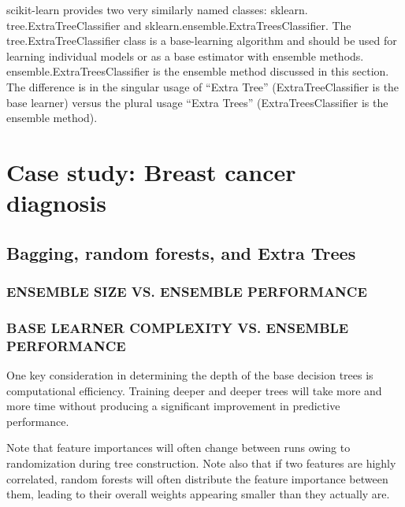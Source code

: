 \begin{tcolorbox}[title=CAUTION]
    scikit-learn provides two very similarly named classes: sklearn.
    tree.ExtraTreeClassifier
    and
    sklearn.ensemble.ExtraTreesClassifier. The tree.ExtraTreeClassifier class is a base-learning algorithm and should be used for learning individual models or as a base estimator
    with ensemble methods. ensemble.ExtraTreesClassifier is the ensemble method discussed in this section. The difference is in the singular usage of
    “Extra Tree” (ExtraTreeClassifier is the base learner) versus the plural
    usage “Extra Trees” (ExtraTreesClassifier is the ensemble method).
\end{tcolorbox}

\section{Case study: Breast cancer diagnosis}
\subsection{Bagging, random forests, and Extra Trees}
\subsubsection*{ENSEMBLE SIZE VS. ENSEMBLE PERFORMANCE}
\subsubsection*{BASE LEARNER COMPLEXITY VS. ENSEMBLE PERFORMANCE}
One key consideration in determining the depth of the base decision trees is computational efficiency. Training deeper and deeper trees will take more and more time
without producing a significant improvement in predictive performance.


\begin{tcolorbox}[title=CAUTION]
    Note that feature importances will often change between runs
    owing to randomization during tree construction. Note also that if two features are highly correlated, random forests will often distribute the feature
    importance between them, leading to their overall weights appearing smaller
    than they actually are.
\end{tcolorbox}

